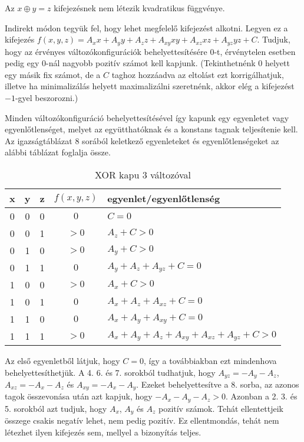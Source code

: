 \begin{theorem}
	\label{XORnotexist}
		Az $x \oplus y = z$ kifejezésnek nem létezik kvadratikus függvénye.
		
		Indirekt módon tegyük fel, hogy lehet megfelelő kifejezést alkotni. Legyen ez a kifejezés $f(x,y,z)=A_xx+A_yy+A_zz+A_{xy}xy+A_{xz}xz+A_{yz}yz+C$. Tudjuk, hogy az érvényes változókonfigurációk behelyettesítésére $0$-t, érvénytelen esetben pedig egy $0$-nál nagyobb pozitív számot kell kapjunk. 
		(Tekinthetnénk $0$ helyett egy másik fix számot, de a $C$ taghoz hozzáadva az eltolást ezt korrigálhatjuk, illetve ha minimalizálás helyett maximalizálni szeretnénk, akkor elég a kifejezést $-1$-gyel beszorozni.)
		
		Minden változókonfiguráció behelyettesítésével így kapunk egy egyenletet vagy egyenlőtlenséget, melyet az együtthatóknak és a konstans tagnak teljesítenie kell. Az igazságtáblázat 8 sorából keletkező egyenleteket és egyenlőtlenségeket az alábbi táblázat foglalja össze.
		
		\begin{table}[ht]
			\footnotesize
			\centering
			\begin{tabular}{ c c c c l }
				\toprule
				x & y & z & $f(x,y,z)$ & egyenlet/egyenlőtlenség \\
				\midrule
				0 & 0 & 0 & $0 $ & $C=0$   \\
				0 & 0 & 1 & $>0$ & $A_{z}+C>0$ \\
				0 & 1 & 0 & $>0$ & $A_{y}+C>0$ \\
				0 & 1 & 1 & $0 $ & $A_{y}+A_{z}+A_{yz}+C=0$   \\
				1 & 0 & 0 & $>0$ & $A_{x}+C>0$ \\
				1 & 0 & 1 & $0 $ & $A_{x}+A_{z}+A_{xz}+C=0$   \\
				1 & 1 & 0 & $0 $ & $A_{x}+A_{y}+A_{xy}+C=0$   \\
				1 & 1 & 1 & $>0$ & $A_{x}+A_{y}+A_{z}+A_{xy}+A_{xz}+A_{yz}+C>0$ \\				
				\bottomrule
			\end{tabular}
			\caption{XOR kapu 3 változóval}
			\label{tab:XORgate3var}
		\end{table}
		
		Az első egyenletből látjuk, hogy $C=0$, így a továbbiakban ezt mindenhova behelyettesíthetjük. A 4. 6. és 7. sorokból tudhatjuk, hogy $A_{yz}=-A_y-A_z$, $A_{xz}=-A_x-A_z$ és $A_{xy}=-A_x-A_y$. Ezeket behelyettesítve a 8. sorba, az azonos tagok összevonása után azt kapjuk, hogy $-A_x-A_y-A_z>0$.
		Azonban a 2. 3. és 5. sorokból azt tudjuk, hogy $A_x$, $A_y$ és $A_z$ pozitív számok. Tehát ellentettjeik összege csakis negatív lehet, nem pedig pozitív. Ez ellentmondás, tehát nem létezhet ilyen kifejezés sem, mellyel a bizonyítás teljes.	
\end{theorem}



